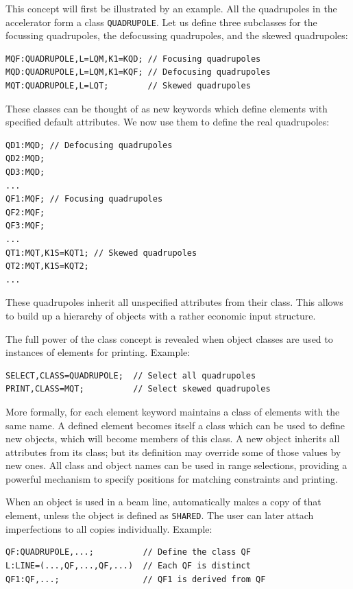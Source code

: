 This concept will first be illustrated by an example.
All the quadrupoles in the accelerator form a class \texttt{QUADRUPOLE}.
Let us define three subclasses for the focussing quadrupoles,
the defocussing quadrupoles, and the skewed quadrupoles:
\begin{verbatim}
MQF:QUADRUPOLE,L=LQM,K1=KQD; // Focusing quadrupoles
MQD:QUADRUPOLE,L=LQM,K1=KQF; // Defocusing quadrupoles
MQT:QUADRUPOLE,L=LQT;        // Skewed quadrupoles
\end{verbatim}
These classes can be thought of as new keywords which define elements
with specified default attributes. 
We now use them to define the real quadrupoles:
\begin{verbatim}
QD1:MQD; // Defocusing quadrupoles
QD2:MQD;
QD3:MQD;
...
QF1:MQF; // Focusing quadrupoles
QF2:MQF;
QF3:MQF;
...
QT1:MQT,K1S=KQT1; // Skewed quadrupoles
QT2:MQT,K1S=KQT2;
...
\end{verbatim}
These quadrupoles inherit all unspecified attributes from their class.
This allows to build up a hierarchy of objects with a rather
economic input structure.

The full power of the class concept is revealed when object classes
are used to  instances of elements for printing.
\noindent Example:
\begin{verbatim}
SELECT,CLASS=QUADRUPOLE;  // Select all quadrupoles
PRINT,CLASS=MQT;          // Select skewed quadrupoles
\end{verbatim}

More formally, for each element keyword \opal maintains a class of
elements with the same name. 
A defined element becomes itself a class which can be used to define
new objects, 
which will become members of this class.
A new object inherits all attributes from its class;
but its definition may override some of those values by new ones.
All class and object names can be used in range selections,
providing a powerful mechanism to specify positions
for matching constraints and printing.

When an object is used in a beam line,
\opal automatically makes a copy of that element,
unless the object is defined as \texttt{SHARED}.
The user can later attach imperfections to all copies individually.
Example:
\begin{verbatim}
QF:QUADRUPOLE,...;          // Define the class QF
L:LINE=(...,QF,...,QF,...)  // Each QF is distinct
QF1:QF,...;                 // QF1 is derived from QF
\end{verbatim}

